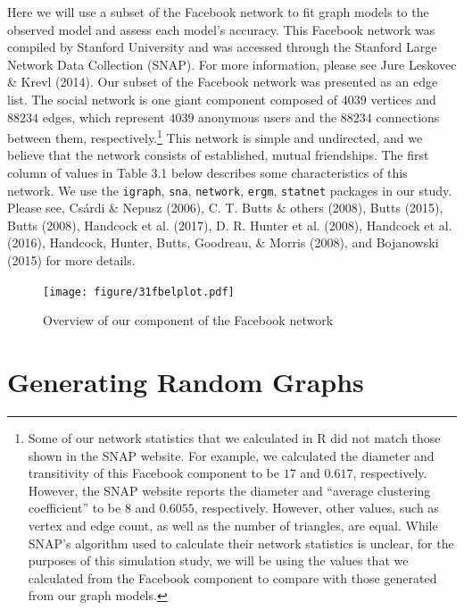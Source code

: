 \documentclass[12pt,twoside]{amherstthesis}
\begin{document}
  Here we will use a subset of the Facebook network to fit graph models to
  the observed model and assess each model's accuracy. This Facebook
  network was compiled by Stanford University and was accessed through the
  Stanford Large Network Data Collection (SNAP). For more information,
  please see Jure Leskovec \& Krevl (2014). Our subset of the Facebook
  network was presented as an edge list. The social network is one giant
  component composed of \(4039\) vertices and \(88234\) edges, which
  represent \(4039\) anonymous users and the \(88234\) connections between
  them, respectively.\footnote{Some of our network statistics that we
    calculated in R did not match those shown in the SNAP website. For
    example, we calculated the diameter and transitivity of this Facebook
    component to be \(17\) and \(0.617\), respectively. However, the SNAP
    website reports the diameter and ``average clustering coefficient'' to
    be \(8\) and \(0.6055\), respectively. However, other values, such as
    vertex and edge count, as well as the number of triangles, are equal.
    While SNAP's algorithm used to calculate their network statistics is
    unclear, for the purposes of this simulation study, we will be using
    the values that we calculated from the Facebook component to compare
    with those generated from our graph models.} This network is simple
  and undirected, and we believe that the network consists of established,
  mutual friendships. The first column of values in Table 3.1 below
  describes some characteristics of this network. We use the
  \texttt{igraph}, \texttt{sna}, \texttt{network}, \texttt{ergm},
  \texttt{statnet} packages in our study. Please see, Csárdi \& Nepusz
  (2006), C. T. Butts \& others (2008), Butts (2015), Butts (2008),
  Handcock et al. (2017), D. R. Hunter et al. (2008), Handcock et al.
  (2016), Handcock, Hunter, Butts, Goodreau, \& Morris (2008), and
  Bojanowski (2015) for more details.
  
  \begin{figure}[htbp]
  \centering
  \texttt{[image: figure/31fbelplot.pdf]}
  \caption{Overview of our component of the Facebook network}
  \end{figure}
  
  \section{Generating Random Graphs}\label{generating-random-graphs}
  
\end{document}
